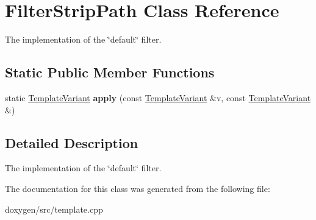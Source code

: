 \hypertarget{class_filter_strip_path}{}\section{Filter\+Strip\+Path Class Reference}
\label{class_filter_strip_path}


The implementation of the \char`\"{}default\char`\"{} filter.  


\subsection*{Static Public Member Functions}
\begin{DoxyCompactItemize}
\item 
\mbox{\label{class_filter_strip_path_ad5008a4cd7b84d95bcaa92c267e7d17a}} 
static \mbox{\hyperlink{class_template_variant}{Template\+Variant}} {\bfseries apply} (const \mbox{\hyperlink{class_template_variant}{Template\+Variant}} \&v, const \mbox{\hyperlink{class_template_variant}{Template\+Variant}} \&)
\end{DoxyCompactItemize}


\subsection{Detailed Description}
The implementation of the \char`\"{}default\char`\"{} filter. 

The documentation for this class was generated from the following file\+:\begin{DoxyCompactItemize}
\item 
doxygen/src/template.\+cpp\end{DoxyCompactItemize}
